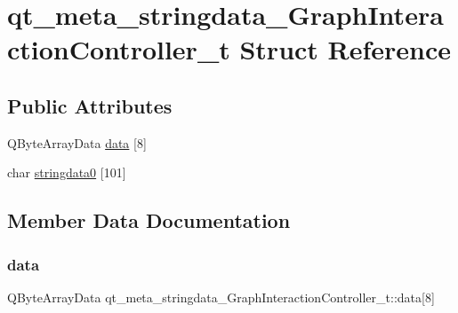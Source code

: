 \hypertarget{structqt__meta__stringdata___graph_interaction_controller__t}{}\section{qt\+\_\+meta\+\_\+stringdata\+\_\+\+Graph\+Interaction\+Controller\+\_\+t Struct Reference}
\label{structqt__meta__stringdata___graph_interaction_controller__t}
\subsection*{Public Attributes}
\begin{DoxyCompactItemize}
\item 
Q\+Byte\+Array\+Data \mbox{\hyperlink{structqt__meta__stringdata___graph_interaction_controller__t_a9522f26f8dfb817b22488e349825016a}{data}} \mbox{[}8\mbox{]}
\item 
char \mbox{\hyperlink{structqt__meta__stringdata___graph_interaction_controller__t_af40d77ce576aa6e982e3f73e7f822d8d}{stringdata0}} \mbox{[}101\mbox{]}
\end{DoxyCompactItemize}


\subsection{Member Data Documentation}
\mbox{\label{structqt__meta__stringdata___graph_interaction_controller__t_a9522f26f8dfb817b22488e349825016a}} 
\subsubsection{\texorpdfstring{data}{data}}
{\footnotesize\ttfamily Q\+Byte\+Array\+Data qt\+\_\+meta\+\_\+stringdata\+\_\+\+Graph\+Interaction\+Controller\+\_\+t\+::data\mbox{[}8\mbox{]}}

\mbox{\label{structqt__meta__stringdata___graph_interaction_controller__t_af40d77ce576aa6e982e3f73e7f822d8d}} 
